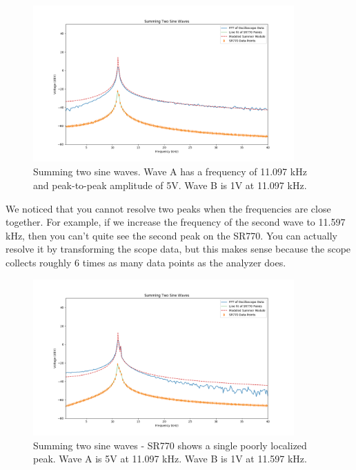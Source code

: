 \documentclass{article}
\begin{document}
\begin{figure}[H]
    \centering
\begin{minipage}{11cm}
\begin{tcolorbox}
    \centering
        \includegraphics[width=10cm, height=6cm]{figures/figure10.png}
        \caption{Summing two sine waves. Wave A has a frequency of 11.097 kHz
        and peak-to-peak amplitude of 5V. Wave B is 1V at 11.097 kHz.}
        \label{fig:fig10}
\end{tcolorbox}
\end{minipage}
\end{figure}

We noticed that you cannot resolve two peaks when the frequencies are close
together. For example, if we increase the frequency of the second wave to
11.597 kHz, then you can't quite see the second peak on the SR770. You can
actually resolve it by transforming the scope data, but this makes sense
because the scope collects roughly 6 times as many data points as the analyzer
does.

\begin{figure}[H]
    \centering
\begin{minipage}{11cm}
\begin{tcolorbox}
    \centering
        \includegraphics[width=10cm, height=6cm]{figures/figure11.png}
        \caption{Summing two sine waves - SR770 shows a single poorly
        localized peak. Wave A is 5V at 11.097 kHz. Wave B is 1V at 11.597 kHz.}
        \label{fig:fig11}
\end{tcolorbox}
\end{minipage}
\end{figure}
\end{document}
